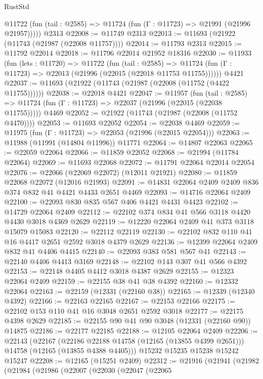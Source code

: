 \begin{lexlean}{RustStd}
\begin{coremodule}
      @11722 (fun (tail : @2585) => @11724 (fun (Γ : @11723) => @21991 (@21996 @21957)))))
    @2313
@22008 := @11749 @2313
@22013 := @11693 (@21922 (@11743 (@21987 (@22008 @11757))))
@22014 := @11793 @2313
@22015 := @11792 @22014
@22018 := @11796 @22014 @21952 @18316
@22030 := @11933
    (fun (lets : @11720) =>
    @11722
      (fun (tail : @2585) =>
      @11724 (fun (Γ : @11723) => @22013 (@21996 (@22015 (@22018 @11753 @11755))))))
    @4421
@22037 := @11693 (@21922 (@11743 (@21987 (@22008 (@11752 (@4422 @11755))))))
@22038 := @22018 @4421
@22047 := @11957
    (fun (tail : @2585) => @11724 (fun (Γ : @11723) => @22037 (@21996 (@22015 (@22038 @11755)))))
    @4469
@22052 := @21922 (@11743 (@21987 (@22008 (@11752 @4470))))
@22053 := @11693 @22052
@22054 := @22038 @4469
@22059 := @11975 (fun (Γ : @11723) => @22053 (@21996 (@22015 @22054)))
@22063 := @11988 (@11991 (@14804 @11996)) @11771
@22064 := @14807 @22063
@22065 := @22059 @22064
@22066 := @11859 @22052
@22068 := @21994 (@11784 @22064)
@22069 := @11693 @22068
@22072 := @11791 @22064 @22014 @22054
@22076 := @22066 (@22069 @22072) (@12011 @21921)
@22080 := @11859 @22068 @22072 (@12016 @21993)
@22091 := @14831 @22064 @2409 @2409 @836 @374 @832 @41 @4421 @4433 @2651 @4469
@22093 := @14716 @22064 @2409
@22100 := @22093 @830 @835 @567 @406 @4421 @4431 @4423
@22102 := @14729 @22064 @2409
@22112 := @22102 @374 @834 @41 @566 @3118 @4420 @4430 @3018 @4369 @2629
@22119 := @12220 @22064 @2409 @41 @373 @3118 @15079 @15083
@22120 := @22112 @22119
@22130 := @22102 @832 @110 @41 @16 @4417 @2651 @2592 @3018 @4379 @2629
@22136 := @12399 @22064 @2409 @832 @41 @4406 @4415
@22140 := @22093 @383 @581 @567 @41
@22143 := @22140 @4406 @4413 @3169
@22148 := @22102 @143 @307 @41 @566 @4392
@22153 := @22148 @4405 @4412 @3018 @4387 @2629
@22155 := @12323 @22064 @2409
@22159 := @22155 @38 @41 @38 @4392
@22160 := @12332 @22064
@22163 := @22159 (@12331 (@22160 @38))
@22165 := @12339 (@12340 @4392)
@22166 := @22163 @22165
@22167 := @22153 @22166
@22175 := @22102 @153 @110 @41 @16 @3048 @2651 @2592 @3018
@22177 := @22175 @4398 @2629
@22185 := @22155 @90 @41 @90 @3048 (@12331 (@22160 @90)) @14875
@22186 := @22177 @22185
@22188 := @12105 @22064 @2409
@22206 := @22143
    (@22167
      (@22186 @22188 @14758 (@12165 (@13855 @4399 @2651)))
      @14758
      (@12165 (@13855 @4388 @4405)))
    @15232
    @15235
    @15238
    @15242
    @15247
@22208 := @12165 (@15251 @2409)
@22312 := @21916
    (@21941
      (@21982
        (@21984
          (@21986
            (@22007
              (@22030
                (@22047
                  (@22065

\end{coremodule}
\end{lexlean}
